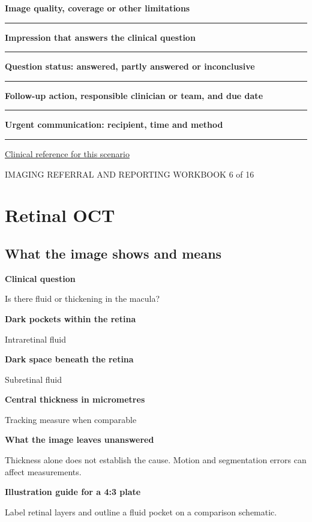 \documentclass[11pt,a4paper]{article}
\newcommand{\record}[1]{\textbf{#1}\par\vspace{0.55\baselineskip}\hrule\vspace{0.35\baselineskip}}
\begin{document}
\record{Image quality, coverage or other limitations}

\record{Impression that answers the clinical question}

\record{Question status: answered, partly answered or inconclusive}

\record{Follow-up action, responsible clinician or team, and due date}

\record{Urgent communication: recipient, time and method}

\small\href{https://www.aaojournal.org/article/S0161-6420(19)32902-5/fulltext/}{Clinical reference for this scenario}

\normalsize

\newpage

{\small IMAGING REFERRAL AND REPORTING WORKBOOK \hfill 6 of 16}

\section*{Retinal OCT}

\subsection*{What the image shows and means}

\textbf{Clinical question}\par Is there fluid or thickening in the macula?\par

\textbf{Dark pockets within the retina}\par Intraretinal fluid\par

\textbf{Dark space beneath the retina}\par Subretinal fluid\par

\textbf{Central thickness in micrometres}\par Tracking measure when comparable\par

\textbf{What the image leaves unanswered}\par Thickness alone does not establish the cause. Motion and segmentation errors can affect measurements.\par

\textbf{Illustration guide for a 4:3 plate}\par Label retinal layers and outline a fluid pocket on a comparison schematic.\par
\end{document}
